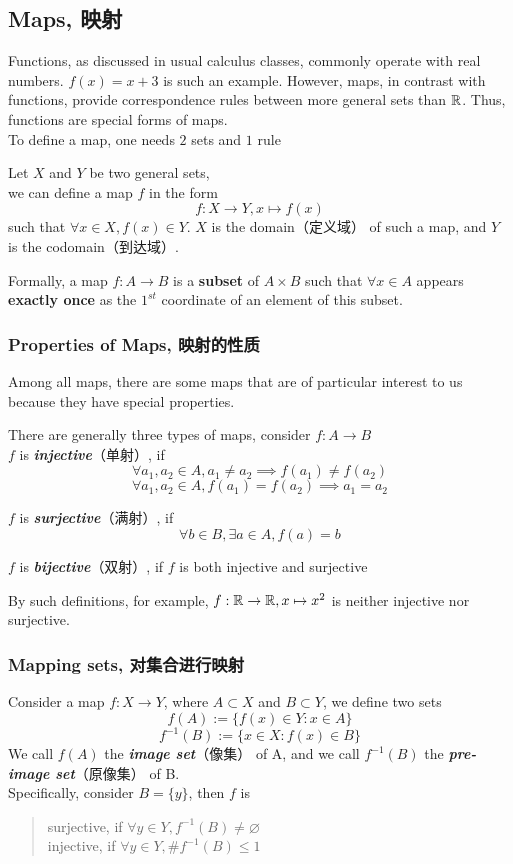 \newpage
\subsection{Maps, 映射}
Functions, as discussed in usual calculus classes, commonly operate with real numbers. $f(x) = x + 3$ is such an example. However, maps, in contrast with functions, provide correspondence rules between more general sets than $\mathbb{R}$. Thus, functions are special forms of maps. \\
To define a map, one needs $2$ sets and $1$ rule
\begin{definition}
    Let $X$ and $Y$ be two general sets, \\
    we can define a map $f$ in the form
    $$f: X \to Y, x \mapsto f(x)$$
    such that $\forall x \in X, f(x) \in Y$. $X$ is the domain（定义域） of such a map, and $Y$ is the codomain（到达域）.
\end{definition}
Formally, a map $f: A \to B$ is a \textbf{subset} of $A \times B$ such that $\forall x \in A$ appears \textbf{exactly once} as the $1^{st}$ coordinate of an element of this subset.

\subsubsection{Properties of Maps, 映射的性质}
Among all maps, there are some maps that are of particular interest to us because they have special properties.
\begin{definition}
    There are generally three types of maps, consider $f: A \to B$ \\
    $f$ is \textbf{\textit{injective}}（单射）, if
    $$\forall a_1, a_2 \in A, a_1 \ne a_2 \implies f(a_1) \ne f(a_2)$$
    $$\forall a_1, a_2 \in A, f(a_1) = f(a_2) \implies a_1 = a_2$$

    $f$ is \textbf{\textit{surjective}}（满射）, if
    $$\forall b \in B, \exists a \in A, f(a) = b$$

    $f$ is \textbf{\textit{bijective}}（双射）, if $f$ is both injective and surjective
\end{definition}
By such definitions, for example, $f: \mathbb{R} \to \mathbb{R}, x \mapsto x^2$ is neither injective nor surjective.

\subsubsection{Mapping sets, 对集合进行映射}
Consider a map $f: X \to Y$, where $A \subset X$ and $B \subset Y$, we define two sets
$$f(A) := \{f(x) \in Y: x \in A\}$$
$$f^{-1}(B) := \{x \in X: f(x) \in B\}$$
We call $f(A)$ the \textbf{\textit{image set}}（像集） of A, and we call $f^{-1}(B)$ the \textbf{\textit{pre-image set}}（原像集） of B. \\
Specifically, consider $B = \{y\}$, then $f$ is
\begin{quote}
    surjective, if $\forall y \in Y, f^{-1}(B) \ne \varnothing$ \\
    injective, if $\forall y \in Y, \# f^{-1}(B) \le 1$
\end{quote}

